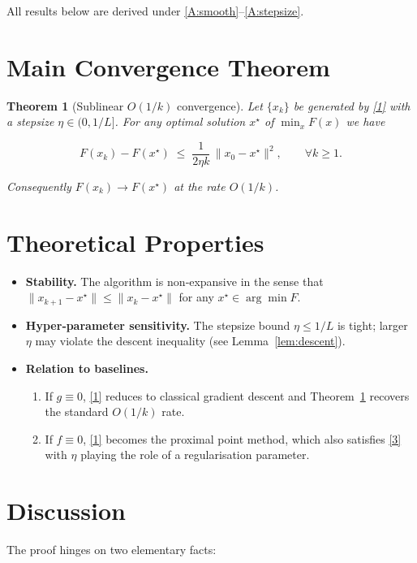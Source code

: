 \documentclass{article}
\newtheorem{theorem}{Theorem}
\begin{document}
All results below are derived under \ref{A:smooth}–\ref{A:stepsize}.

\section*{Main Convergence Theorem}
\begin{theorem}[Sublinear $O(1/k)$ convergence]\label{thm:rate}
Let $\{x_{k}\}$ be generated by \eqref{1} with a stepsize $\eta\in(0,1/L]$.
For any optimal solution $x^{\star}$ of $\min_{x}F(x)$ we have  

\[
F(x_{k})-F(x^{\star})
\;\le\;
\frac{1}{2\eta k}\,\|x_{0}-x^{\star}\|^{2},
\qquad\forall k\ge 1.
\tag{3}
\]

Consequently $F(x_{k})\to F(x^{\star})$ at the rate $O(1/k)$.
\end{theorem}

\section*{Theoretical Properties}
\begin{itemize}[nosep]
  \item \textbf{Stability.} The algorithm is non‑expansive in the sense that
        $\|x_{k+1}-x^{\star}\|\le\|x_{k}-x^{\star}\|$ for any $x^{\star}\in\arg\min F$.
  \item \textbf{Hyper‑parameter sensitivity.}
        The stepsize bound $\eta\le 1/L$ is tight; larger $\eta$ may violate the
        descent inequality (see Lemma~\ref{lem:descent}).
  \item \textbf{Relation to baselines.}
        \begin{enumerate}[nosep]
          \item If $g\equiv0$, \eqref{1} reduces to classical gradient descent
                and Theorem~\ref{thm:rate} recovers the standard $O(1/k)$ rate.
          \item If $f\equiv0$, \eqref{1} becomes the proximal point method,
                which also satisfies \eqref{3} with $\eta$ playing the role of
                a regularisation parameter.
        \end{enumerate}
\end{itemize}

\section*{Discussion}
The proof hinges on two elementary facts:
\end{document}

